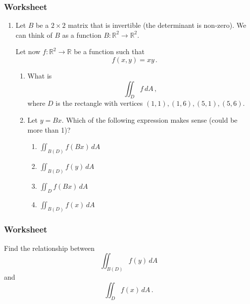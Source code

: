 \documentclass[aspectratio=169]{beamer}
\newcommand{\R}{\mathbb{R}}
\begin{document}
\begin{frame}
    \frametitle{Worksheet}
    \begin{enumerate}
        \item Let $B$ be a $2\times 2$ matrix that is invertible (the determinant is non-zero).
        We can think of $B$ as a function $B: \R^2 \to \R^2$.

        Let now $f:\R^2 \to \R$ be a function such that
        \begin{equation*}
            f(x,y) = xy \,.
        \end{equation*}
        \begin{enumerate}
            \item What is 
                \begin{equation*}
                    \iint_D f \, dA \,,
                \end{equation*}
                where $D$ is the rectangle with vertices $(1,1), (1,6), (5,1), (5,6)$.
            \item Let $y = Bx$.
                Which of the following expression makes sense (could be more than 1)?
                \begin{enumerate}
                    \item $\iint_{B(D)} f(Bx) \, dA$
                    \item $\iint_{B(D)} f(y) \, dA$
                    \item $\iint_{D} f(Bx) \, dA$
                    \item $\iint_{B(D)} f(x) \, dA$
                \end{enumerate}
        \end{enumerate}
    \end{enumerate}
\end{frame}

\begin{frame}
    \frametitle{Worksheet}
    Find the relationship between
    \begin{equation*}
        \iint_{B(D)} f(y) \, dA
    \end{equation*}
    and
    \begin{equation*}
        \iint_D f(x) \, dA \,.
    \end{equation*}
\end{frame}
\end{document}
